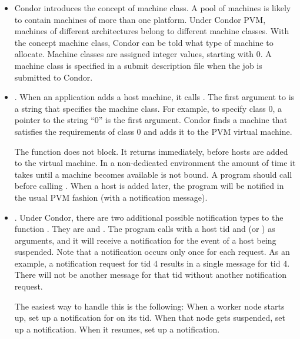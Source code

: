 \begin{itemize}

\item Condor introduces the concept of machine class.
  A pool of machines is likely to contain machines of more than
  one platform.
  Under Condor PVM, machines of
  different architectures belong to different machine classes.
  With the concept machine class,
  Condor can be told what type
  of machine to allocate.
  Machine classes are assigned integer values, starting with 0.
  A machine class is
  specified in a submit description file when the job
  is submitted to Condor.

\item {}.  When an application
  adds a host machine, it calls .
  The first argument to 
  is a string that specifies the machine class.
  For example, to specify class 0, a pointer to the string ``0''
  is the first argument.  Condor finds a machine
  that satisfies the requirements of class 0 and adds it to the PVM
  virtual machine.

  The function  does not block.  It
  returns immediately, before hosts are added to the virtual
  machine.  
  In a non-dedicated environment the amount of time it takes until
  a machine becomes available is not bound.
  A program should call 
   before calling
  . When a host is added later, the program
  will be notified in the usual PVM 
  fashion (with a  notification message).
    
\item {}.  Under Condor, there are two additional 
  possible notification types
  to the function .
  They are  and
  .
  The program calls 
  with a host tid and  (or )
  as arguments, and it will receive
  a notification for the event of a host being suspended.
  Note that a notification occurs only once for each request.
  As an example,
  a  
  notification request for tid 4 results in a single 
  message for tid 4. 
  There will not be another  message for
  that tid without another notification request.

  The easiest way to handle this is the following:  When a worker
  node starts up, set up a notification for  on
  its tid.  When that node gets suspended, set up a 
  notification.  When it resumes, set up a 
  notification.



\end{itemize}
